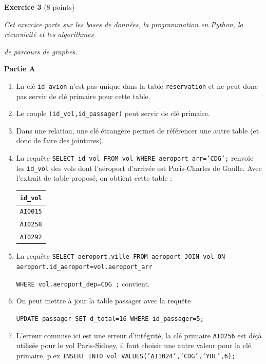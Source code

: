 \documentclass[11pt,a4paper]{article}
\begin{document}
\bigskip

\textbf{Exercice 3} (8 points)

\medskip

\textit{Cet exercice porte sur les bases de données, la programmation en Python, la
récursivité et les algorithmes}

\textit{de parcours de graphes.}

\smallskip

\textbf{Partie A}

\begin{enumerate}
\item La clé \texttt{id\_avion} n'est pas unique dans la table \texttt{reservation} et 
ne peut donc pas servir de clé primaire pour cette table.

\item Le couple \texttt{(id\_vol,id\_passager)} peut servir de clé primaire.

\item Dans une relation, une clé étrangère permet de référencer une autre table (et donc de faire des jointures).

\item La requête \texttt{SELECT id\_vol FROM vol WHERE aeroport\_arr='CDG';} renvoie les \texttt{id\_vol} des vols dont l'aéroport d'arrivée est Paris-Charles de Gaulle. Avec l'extrait de table proposé, on obtient cette table :

\begin{center}
\begin{tabular}{|c|}
\hline
\texttt{id\_vol}\\
\hline
\texttt{AI0015}\\
\texttt{AI0258}\\
\texttt{AI0292}\\
\hline

\end{tabular}
\end{center}

\item La requête \texttt{SELECT aeroport.ville FROM aeroport JOIN vol ON aeroport.id\_aeroport=vol.aeroport\_arr}

\texttt{WHERE vol.aeroport\_dep=CDG ;} convient.

\item On peut mettre à jour la table passager avec la requête

\texttt{UPDATE passager SET d\_total=16 WHERE id\_passager=5; }
\item L'erreur commise ici est une erreur d'intégrité, la clé primaire \texttt{AI0256} est déjà utilisée pour le vol Paris-Sidney, il faut choisir une autre valeur pour la clé primaire, p.ex \texttt{INSERT INTO vol VALUES('AI1024','CDG','YUL',6);}
\end{enumerate}
\end{document}
